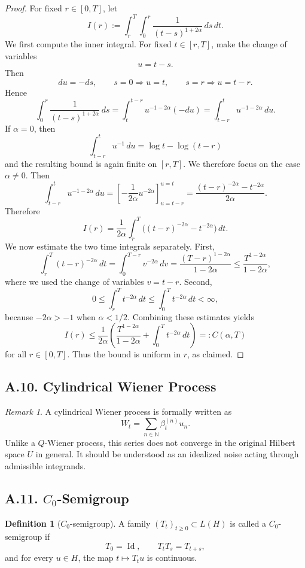 \documentclass[11pt]{article}
\theoremstyle{definition}
\newtheorem{definition}{Definition}
\theoremstyle{remark}
\newtheorem{remark}{Remark}
\begin{document}
\begin{proof}
For fixed \(r\in[0,T]\), let
\[
I(r)
:=
\int_r^T\int_0^r \frac{1}{(t-s)^{1+2\alpha}}\,ds\,dt.
\]
We first compute the inner integral. For fixed \(t\in[r,T]\), make the change of variables
\[
u=t-s.
\]
Then
\[
du=-ds,
\qquad
s=0 \Longrightarrow u=t,
\qquad
s=r \Longrightarrow u=t-r.
\]
Hence
\[
\int_0^r \frac{1}{(t-s)^{1+2\alpha}}\,ds
=
\int_t^{t-r} u^{-1-2\alpha}(-du)
=
\int_{t-r}^{t} u^{-1-2\alpha}\,du.
\]
If \(\alpha=0\), then
\[
\int_{t-r}^{t} u^{-1}\,du
=
\log t-\log(t-r)
\]
and the resulting bound is again finite on \([r,T]\). We therefore focus on the case \(\alpha\neq 0\). Then
\[
\int_{t-r}^{t} u^{-1-2\alpha}\,du
=
\left[-\frac{1}{2\alpha}u^{-2\alpha}\right]_{u=t-r}^{u=t}
=
\frac{(t-r)^{-2\alpha}-t^{-2\alpha}}{2\alpha}.
\]
Therefore
\[
I(r)
=
\frac{1}{2\alpha}\int_r^T \bigl((t-r)^{-2\alpha}-t^{-2\alpha}\bigr)\,dt.
\]
We now estimate the two time integrals separately. First,
\[
\int_r^T (t-r)^{-2\alpha}\,dt
=
\int_0^{T-r} v^{-2\alpha}\,dv
=
\frac{(T-r)^{1-2\alpha}}{1-2\alpha}
\le
\frac{T^{1-2\alpha}}{1-2\alpha},
\]
where we used the change of variables \(v=t-r\). Second,
\[
0\le \int_r^T t^{-2\alpha}\,dt \le \int_0^T t^{-2\alpha}\,dt<\infty,
\]
because \(-2\alpha>-1\) when \(\alpha<1/2\). Combining these estimates yields
\[
I(r)
\le
\frac{1}{2\alpha}\left(
\frac{T^{1-2\alpha}}{1-2\alpha}
+
\int_0^T t^{-2\alpha}\,dt
\right)
=:
C(\alpha,T)
\]
for all \(r\in[0,T]\). Thus the bound is uniform in \(r\), as claimed.
\end{proof}

\subsection*{A.10. Cylindrical Wiener Process}
\begin{remark}
A cylindrical Wiener process is formally written as
\[
W_t=\sum_{n\in\mathbb N}\beta_t^{(n)}u_n.
\]
Unlike a \(Q\)-Wiener process, this series does not converge in the original Hilbert space \(U\) in general. It should be understood as an idealized noise acting through admissible integrands.
\end{remark}

\subsection*{A.11. \(C_0\)-Semigroup}
\begin{definition}[\(C_0\)-semigroup]
A family \((T_t)_{t\ge 0}\subset L(H)\) is called a \(C_0\)-semigroup if
\[
T_0=\operatorname{Id},
\qquad
T_tT_s=T_{t+s},
\]
and for every \(u\in H\), the map \(t\mapsto T_tu\) is continuous.
\end{definition}
\end{document}
